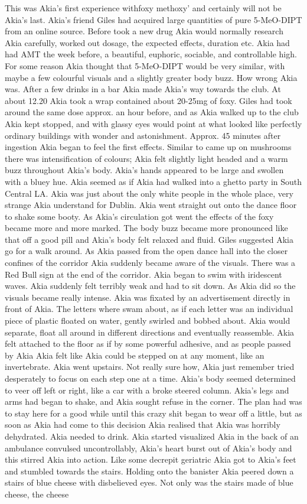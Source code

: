 \documentclass[12pt]{book}
\begin{document}
This was Akia's first experience withfoxy methoxy' and certainly will not be Akia's last. Akia's friend Giles had acquired large quantities of pure 5-MeO-DIPT from an online source. Before took a new drug Akia would normally research Akia carefully, worked out dosage, the expected effects, duration etc. Akia had had AMT the week before, a beautiful, euphoric, sociable, and controllable high. For some reason Akia thought that 5-MeO-DIPT would be very similar, with maybe a few colourful visuals and a slightly greater body buzz. How wrong Akia was. After a few drinks in a bar Akia made Akia's way towards the club. At about 12.20 Akia took a wrap contained about 20-25mg of foxy. Giles had took around the same dose approx. an hour before, and as Akia walked up to the club Akia kept stopped, and with glassy eyes would point at what looked like perfectly ordinary buildings with wonder and astonishment. Approx. 45 minutes after ingestion Akia began to feel the first effects. Similar to came up on mushrooms there was intensification of colours; Akia felt slightly light headed and a warm buzz throughout Akia's body. Akia's hands appeared to be large and swollen with a bluey hue. Akia seemed as if Akia had walked into a ghetto party in South Central LA. Akia was just about the only white people in the whole place, very strange Akia understand for Dublin. Akia went straight out onto the dance floor to shake some booty. As Akia's circulation got went the effects of the foxy became more and more marked. The body buzz became more pronounced like that off a good pill and Akia's body felt relaxed and fluid. Giles suggested Akia go for a walk around. As Akia passed from the open dance hall into the closer confines of the corridor Akia suddenly became aware of the visuals. There was a Red Bull sign at the end of the corridor. Akia began to swim with iridescent waves. Akia suddenly felt terribly weak and had to sit down. As Akia did so the visuals became really intense. Akia was fixated by an advertisement directly in front of Akia. The letters where swam about, as if each letter was an individual piece of plastic floated on water, gently swirled and bobbed about. Akia would separate, float all around in different directions and eventually reassemble. Akia felt attached to the floor as if by some powerful adhesive, and as people passed by Akia Akia felt like Akia could be stepped on at any moment, like an invertebrate. Akia went upstairs. Not really sure how, Akia just remember tried desperately to focus on each step one at a time. Akia's body seemed determined to veer off left or right, like a car with a broke steered column. Akia's legs and arms had began to shake, and Akia sought refuse in the corner. The plan had was to stay here for a good while until this crazy shit began to wear off a little, but as soon as Akia had come to this decision Akia realised that Akia was horribly dehydrated. Akia needed to drink. Akia started visualized Akia in the back of an ambulance convulsed uncontrollably, Akia's heart burst out of Akia's body and this stirred Akia into action. Like some decrepit geriatric Akia got to Akia's feet and stumbled towards the stairs. Holding onto the banister Akia peered down a stairs of blue cheese with disbelieved eyes. Not only was the stairs made of blue cheese, the cheese 
\end{document}
